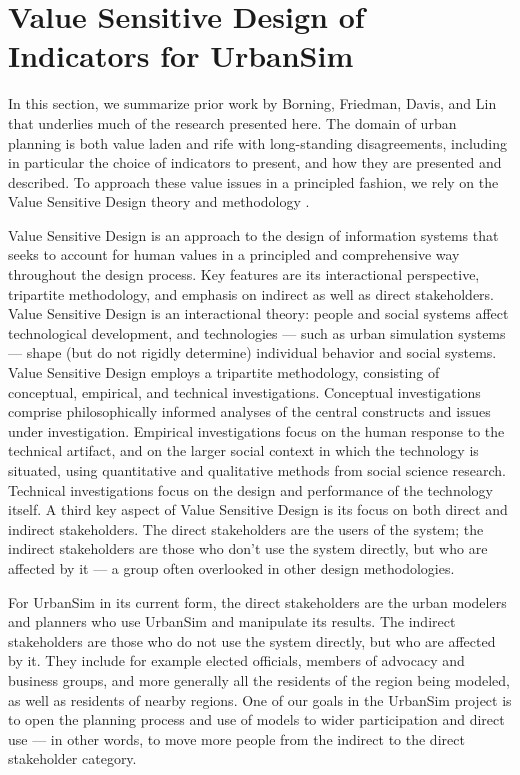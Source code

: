 
\section{Value Sensitive Design of Indicators for UrbanSim}
\label{sec:prevwork}

In this section, we summarize prior work by Borning, Friedman, Davis, and
Lin \cite{borning-ecscw-2005} that underlies much of the research presented
here.  The domain of urban planning is both value laden and rife with
long-standing disagreements, including in particular the choice of
indicators to present, and how they are presented and described.  To
approach these value issues in a principled fashion, we rely on the Value
Sensitive Design theory and methodology \cite{friedman-amis-2006}.

Value Sensitive Design is an approach to the design of information systems
that seeks to account for human values in a principled and comprehensive
way throughout the design process.  Key features are its interactional
perspective, tripartite methodology, and emphasis on indirect as well as
direct stakeholders.  Value Sensitive Design is an interactional theory:
people and social systems affect technological development, and
technologies --- such as urban simulation systems --- shape (but do not
rigidly determine) individual behavior and social systems.  Value Sensitive
Design employs a tripartite methodology, consisting of conceptual,
empirical, and technical investigations.  Conceptual investigations
comprise philosophically informed analyses of the central constructs and
issues under investigation.  Empirical investigations focus on the human
response to the technical artifact, and on the larger social context in
which the technology is situated, using quantitative and qualitative
methods from social science research.  Technical investigations focus on
the design and performance of the technology itself.  A third key aspect of
Value Sensitive Design is its focus on both direct and indirect
stakeholders.  The direct stakeholders are the users of the system; the
indirect stakeholders are those who don't use the system directly, but who
are affected by it --- a group often overlooked in other design
methodologies.

For UrbanSim in its current form, the direct stakeholders are the urban
modelers and planners who use UrbanSim and manipulate its
results.  The indirect stakeholders are those who do not use the system
directly, but who are affected by it.  They include for example elected
officials, members of advocacy and business groups, and more generally all
the residents of the region being modeled, as well as residents of nearby
regions.  One of our goals in the UrbanSim project is to open the planning
process and use of models to wider participation and direct use --- in
other words, to move more people from the indirect to the direct
stakeholder category.


